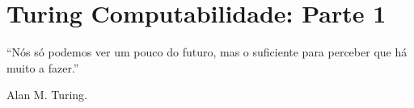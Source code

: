 \chapter{Turing Computabilidade: Parte 1}\label{cap:MaquinaTuring}


\epigraph{``Nós só podemos ver um pouco do futuro, mas o suficiente para perceber que há muito a fazer.''}{Alan M. Turing.}

